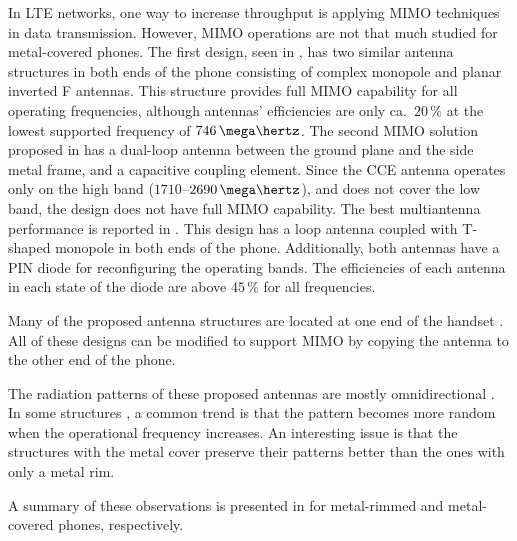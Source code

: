 In LTE networks, one way to increase throughput is applying MIMO techniques in data transmission. However, MIMO operations are not that much studied for metal-covered phones. The first design, seen in \cite{son_wideband_mimo}, has two similar antenna structures in both ends of the phone consisting of complex monopole and planar inverted F antennas. This structure provides full MIMO capability for all operating frequencies, although antennas' efficiencies are only ca.\ $20\,\%$ at the lowest supported frequency of $746\,\mega\hertz$. The second MIMO solution proposed in \cite{stanley_lte_mimo} has a dual-loop antenna between the ground plane and the side metal frame, and a capacitive coupling element. Since the CCE antenna operates only on the high band ($1710$--$2690\,\mega\hertz$), and does not cover the low band, the design does not have full MIMO capability. The best multiantenna performance is reported in \cite{reconf_narrow}. This design has a loop antenna coupled with T-shaped monopole in both ends of the phone. Additionally, both antennas have a PIN diode for reconfiguring the operating bands. The efficiencies of each antenna in each state of the diode are above $45\,\%$ for all frequencies.

Many of the proposed antenna structures are located at one end of the handset \cite{hsu_compact,yuan_slot,hybrid,lee_monopole,valkonen_multifeed,chen_metal_frame,hepta_ifa,chen_compact_lte}. All of these designs can be modified to support MIMO by copying the antenna to the other end of the phone.

The radiation patterns of these proposed antennas are mostly omnidirectional \cite{lee_monopole,reconf_narrow,hsu_compact,wu_pier,zhong_pier,son_wideband_mimo}. In some structures \cite{hybrid,hepta_ifa,yuan_slot,ban_dual_loop}, a common trend is that the pattern becomes more random when the operational frequency increases. An interesting issue is that the structures with the metal cover \cite{wu_pier,zhong_pier,son_wideband_mimo} preserve their patterns better than the ones with only a metal rim.

A summary of these observations is presented in  for metal-rimmed and metal-covered phones, respectively.


